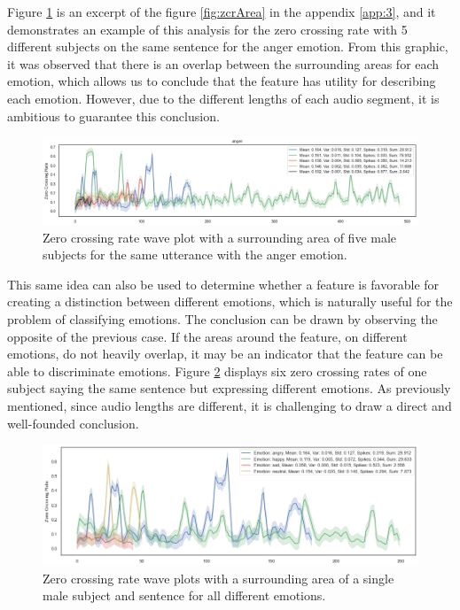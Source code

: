 Figure \ref{fig:zcrAreaOnly1} is an excerpt of the figure \ref{fig:zcrArea} in the appendix \ref{app:3}, and it demonstrates an example of this analysis for the zero crossing rate with 5 different subjects on the same sentence for the anger emotion. From this graphic, it was observed that there is an overlap between the surrounding areas for each emotion, which allows us to conclude that the feature has utility for describing each emotion. However, due to the different lengths of each audio segment, it is ambitious to guarantee this conclusion.

\begin{figure}[H]
	\centering
	\includegraphics[width=1\linewidth]{figs/4_1_traditional/zcrAreaOnly1.png}
	\caption{Zero crossing rate wave plot with a surrounding area of five male subjects for the same utterance with the anger emotion.}
	\label{fig:zcrAreaOnly1}
\end{figure}

This same idea can also be used to determine whether a feature is favorable for creating a distinction between different emotions, which is naturally useful for the problem of classifying emotions. The conclusion can be drawn by observing the opposite of the previous case. If the areas around the feature, on different emotions, do not heavily overlap, it may be an indicator that the feature can be able to discriminate emotions. Figure \ref{fig:zcrAreaSameSubj} displays six zero crossing rates of one subject saying the same sentence but expressing different emotions. As previously mentioned, since audio lengths are different, it is challenging to draw a direct and well-founded conclusion.

\begin{figure}[H]
	\centering
	\includegraphics[width=.8\linewidth]{figs/4_1_traditional/zcr_male_same_subject.png}
	\caption{Zero crossing rate wave plots with a surrounding area of a single male subject and sentence for all different emotions.}
	\label{fig:zcrAreaSameSubj}
\end{figure}

